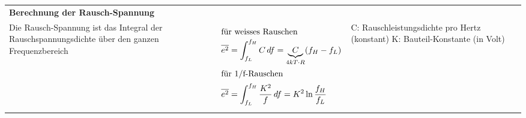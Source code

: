 \vspace{-2.5\topsep}
\begin{longtable}[t]{|p{4cm}|p{5.5cm}|p{7.8cm}|}
    \hline  
    \multicolumn{3}{|l|}{\bf Berechnung der Rausch-Spannung}
    \\ \hdashline
    Die Rausch-Spannung ist das Integral der Rauschspannungsdichte über den ganzen Frequenzbereich
    & {\vspace{-1.5\topsep}
       \begin{align*}
            \intertext{für weisses Rauschen}
            \overline{e^2} &= \int_{f_L}^{f_H} C \, df = \underbrace{C}_{4kT\cdot R} (f_H-f_L) \\
            \intertext{für 1/f-Rauschen}
            \overline{e^2} &= \int_{f_L}^{f_H} \frac{K^2}{f} \, df = K^2 \ln\frac{f_H}{f_L}
       \end{align*}
      }
    & {C: Rauschleistungsdichte pro Hertz (konstant)\newline
       \newline\newline\newline
       K: Bauteil-Konstante (in Volt)
      }
    \\ \hline
\end{longtable}
\newpage
\vspace{-2.5\topsep}
